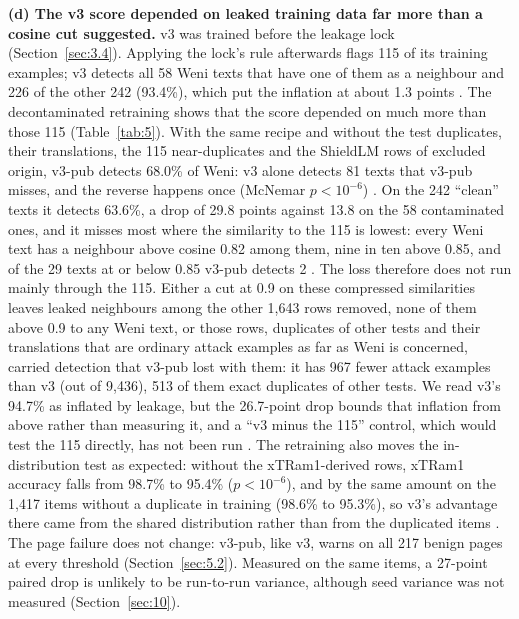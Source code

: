 \documentclass[11pt]{article}
\begin{document}
\textbf{(d) The v3 score depended on leaked training data far more than a cosine cut suggested.} v3 was trained before the leakage lock (Section~\ref{sec:3.4}). Applying the lock's rule afterwards flags 115 of its training examples; v3 detects all 58 Weni texts that have one of them as a neighbour and 226 of the other 242 (93.4\%), which put the inflation at about 1.3 points%
. The decontaminated retraining shows that the score depended on much more than those 115 (Table~\ref{tab:5}). With the same recipe and without the test duplicates, their translations, the 115 near-duplicates and the ShieldLM rows of excluded origin, v3-pub detects 68.0\% of Weni: v3 alone detects 81 texts that v3-pub misses, and the reverse happens once (McNemar $p<10^{-6}$)%
. On the 242 ``clean'' texts it detects 63.6\%, a drop of 29.8 points against 13.8 on the 58 contaminated ones, and it misses most where the similarity to the 115 is lowest: every Weni text has a neighbour above cosine 0.82 among them, nine in ten above 0.85, and of the 29 texts at or below 0.85 v3-pub detects 2%
. The loss therefore does not run mainly through the 115. Either a cut at 0.9 on these compressed similarities leaves leaked neighbours among the other 1,643 rows removed, none of them above 0.9 to any Weni text, or those rows, duplicates of other tests and their translations that are ordinary attack examples as far as Weni is concerned, carried detection that v3-pub lost with them: it has 967 fewer attack examples than v3 (out of 9,436), 513 of them exact duplicates of other tests. We read v3's 94.7\% as inflated by leakage, but the 26.7-point drop bounds that inflation from above rather than measuring it, and a ``v3 minus the 115'' control, which would test the 115 directly, has not been run%
. The retraining also moves the in-distribution test as expected: without the xTRam1-derived rows, xTRam1 accuracy falls from 98.7\% to 95.4\% ($p<10^{-6}$), and by the same amount on the 1,417 items without a duplicate in training (98.6\% to 95.3\%), so v3's advantage there came from the shared distribution rather than from the duplicated items%
. The page failure does not change: v3-pub, like v3, warns on all 217 benign pages at every threshold (Section~\ref{sec:5.2}). Measured on the same items, a 27-point paired drop is unlikely to be run-to-run variance, although seed variance was not measured (Section~\ref{sec:10}).
\end{document}
